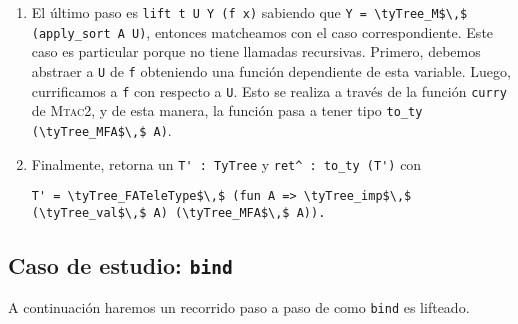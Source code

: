 \begin{enumerate}
    Esto nos es útil porque ahora podemos generar un valor \lstinline{x : X'}en \lift, donde \lstinline{X'} es \lstinline{MTele_val (MTele_In \Type_sort F)}.
    Es decir que \lstinline{x} es una variable del tipo resultante de liftear \lstinline{X}, el lado izquierdo de la implicación. Lo que resta es tomar nuestra función \lstinline{f} de tipo \lstinline{X'-> Y} y liftearla. Esto signfica liftear \lstinline{f x}.
    \item El último paso es \lstinline{lift t U Y (f x)} sabiendo que \lstinline{Y = \tyTree_M$\,$ (apply_sort A U)}, entonces matcheamos con el caso correspondiente.
    Este caso es particular porque no tiene llamadas recursivas.
    Primero, debemos abstraer a \lstinline{U} de \lstinline{f} obteniendo una función dependiente de esta variable.
    Luego, currificamos a \lstinline{f} con respecto a \lstinline{U}. Esto se realiza a través de la función \lstinline{curry} de \textsc{Mtac2}, y de esta manera, la función pasa a tener tipo \lstinline{to_ty (\tyTree_MFA$\,$ A)}.
    \item Finalmente, \lift retorna un \lstinline{T' : TyTree} y \lstinline{ret^ : to_ty (T')} con
    \begin{lstlisting}
T' = \tyTree_FATeleType$\,$ (fun A => \tyTree_imp$\,$ (\tyTree_val$\,$ A) (\tyTree_MFA$\,$ A)).
    \end{lstlisting}
\end{enumerate}


\subsection{Caso de estudio: \texttt{bind}}

A continuación haremos un recorrido paso a paso de como \lstinline{bind} es lifteado.

